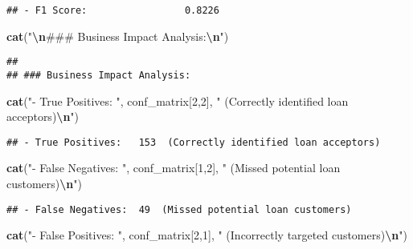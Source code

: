 \documentclass[
]{article}
\newenvironment{Shaded}{\begin{snugshade}}{\end{snugshade}}
\newcommand{\DecValTok}[1]{\textcolor[rgb]{0.00,0.00,0.81}{#1}}
\newcommand{\FunctionTok}[1]{\textcolor[rgb]{0.13,0.29,0.53}{\textbf{#1}}}
\newcommand{\NormalTok}[1]{#1}
\newcommand{\SpecialCharTok}[1]{\textcolor[rgb]{0.81,0.36,0.00}{\textbf{#1}}}
\newcommand{\StringTok}[1]{\textcolor[rgb]{0.31,0.60,0.02}{#1}}
\begin{document}
\begin{verbatim}
## - F1 Score:                 0.8226
\end{verbatim}

\begin{Shaded}
\begin{Highlighting}[]
\FunctionTok{cat}\NormalTok{(}\StringTok{"}\SpecialCharTok{\textbackslash{}n}\StringTok{\#\#\# Business Impact Analysis:}\SpecialCharTok{\textbackslash{}n}\StringTok{"}\NormalTok{)}
\end{Highlighting}
\end{Shaded}

\begin{verbatim}
## 
## ### Business Impact Analysis:
\end{verbatim}

\begin{Shaded}
\begin{Highlighting}[]
\FunctionTok{cat}\NormalTok{(}\StringTok{"{-} True Positives:  "}\NormalTok{, conf\_matrix[}\DecValTok{2}\NormalTok{,}\DecValTok{2}\NormalTok{], }\StringTok{" (Correctly identified loan acceptors)}\SpecialCharTok{\textbackslash{}n}\StringTok{"}\NormalTok{)}
\end{Highlighting}
\end{Shaded}

\begin{verbatim}
## - True Positives:   153  (Correctly identified loan acceptors)
\end{verbatim}

\begin{Shaded}
\begin{Highlighting}[]
\FunctionTok{cat}\NormalTok{(}\StringTok{"{-} False Negatives: "}\NormalTok{, conf\_matrix[}\DecValTok{1}\NormalTok{,}\DecValTok{2}\NormalTok{], }\StringTok{" (Missed potential loan customers)}\SpecialCharTok{\textbackslash{}n}\StringTok{"}\NormalTok{)}
\end{Highlighting}
\end{Shaded}

\begin{verbatim}
## - False Negatives:  49  (Missed potential loan customers)
\end{verbatim}

\begin{Shaded}
\begin{Highlighting}[]
\FunctionTok{cat}\NormalTok{(}\StringTok{"{-} False Positives: "}\NormalTok{, conf\_matrix[}\DecValTok{2}\NormalTok{,}\DecValTok{1}\NormalTok{], }\StringTok{" (Incorrectly targeted customers)}\SpecialCharTok{\textbackslash{}n}\StringTok{"}\NormalTok{)}
\end{Highlighting}
\end{Shaded}
\end{document}

